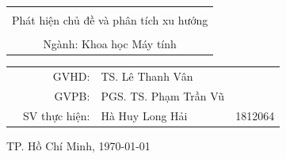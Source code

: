 \begin{titlepage}
\begin{center}
\begin{tabular}{c}
\hline
\\
{\Huge Phát hiện chủ đề và phân tích xu hướng}
\\[1.5em]
\hline

\\
{\large Ngành: \space Khoa học Máy tính }


\end{tabular}
\end{center}

\vspace{1cm}

\begin{table}[h]
\begin{tabular}{rrlr}
\hspace{2.9 cm} &  GVHD: &TS. Lê Thanh Vân \\
\hspace{2.9 cm} &  GVPB: &PGS. TS. Phạm Trần Vũ\\
& SV thực hiện: &Hà Huy Long Hải         &1812064 \\

\end{tabular}
\end{table}

\vfill
\begin{center}
{TP. Hồ Chí Minh, \today }
\end{center}
\end{titlepage}
\thispagestyle{empty}
